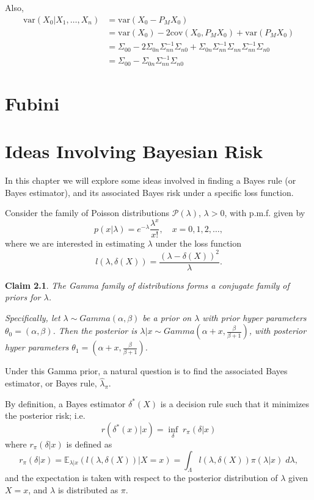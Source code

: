 \documentclass[11pt]{report}
\newtheorem{claim}{Claim}
\begin{document}
Also,
\begin{align*}
\text{var}(X_0|X_1,\ldots, X_n)&= \text{var}(X_0- P_MX_0) \\
& = \text{var}(X_0) - 2\text{cov}(X_0, P_MX_0) +  \text{var}(P_MX_0) \\
& = \Sigma_{00} - 2 \Sigma_{0n}\Sigma_{nn}^{-1}\Sigma_{n0} +\Sigma_{0n}\Sigma_{nn}^{-1}\Sigma_{nn}\Sigma_{nn}^{-1}\Sigma_{n0}\\
& = \Sigma_{00} -  \Sigma_{0n}\Sigma_{nn}^{-1}\Sigma_{n0}
\end{align*}


\chapter{Fubini}

\chapter{Ideas Involving Bayesian Risk}

In this chapter we will explore some ideas involved in finding a Bayes rule (or Bayes estimator), and its associated Bayes risk under a specific loss function. 


Consider the family of Poisson distributions $\mathcal{P}(\lambda)$, $\lambda>0$, with p.m.f. given by 
$$p(x|\lambda) = e^{-\lambda}\frac{\lambda^x}{x!}, \quad x=0,1,2, \dots, $$
where we are interested in estimating $\lambda$ under the loss function
\begin{equation} \label{eq:loss}
l(\lambda,\delta(X)) = \frac{(\lambda-\delta(X))^2}{\lambda}.
\end{equation}
	
\begin{claim}
The Gamma family of distributions forms a conjugate family of priors for $\lambda$.
		
Specifically, let $\lambda \sim Gamma(\alpha,\beta)$ be a prior on $\lambda$ with prior hyper parameters $\theta_0 = (\alpha,\beta)$. Then the posterior is $\lambda|x \sim Gamma\left(\alpha+x, \frac{\beta}{\beta+1}\right)$, with posterior hyper parameters $\theta_1 = \left(\alpha+x, \frac{\beta}{\beta+1}\right)$. 
\end{claim}
		
Under this Gamma prior, a natural question is to find the associated Bayes estimator, or Bayes rule, $\widehat{\lambda}_\pi$.

By definition, a Bayes estimator $\delta^*(X)$ is a decision rule such that it minimizes the posterior risk; i.e.  
$$r(\delta^*(x)|x) = \inf_{\delta}\; r_\pi(\delta|x) $$
where $r_\pi(\delta|x)$ is defined as 
\begin{equation}\label{eq:postrisk}
r_\pi(\delta|x) = \mathbb{E}_{\lambda|x}(l(\lambda,\delta(X))|X=x) = \int_\Lambda l(\lambda,\delta(X)) \pi(\lambda|x) \; d\lambda,
\end{equation}
and the expectation is taken with respect to the posterior distribution of $\lambda$ given $X=x$, and $\lambda$ is distributed as $\pi$. 
\end{document}
